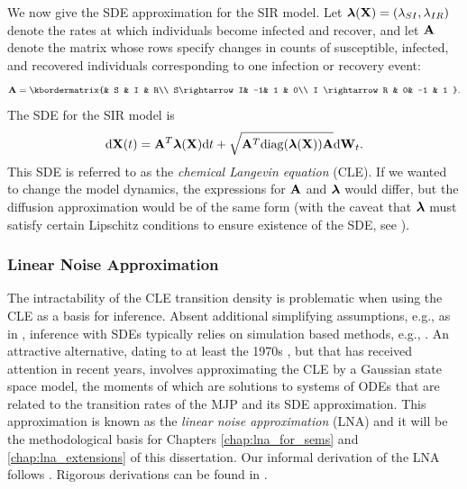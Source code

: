 We now give the SDE approximation for the SIR model. Let $ \boldsymbol{\lambda}(\mathbf{X}) = (\lambda_{SI}, \lambda_{IR}) $ denote the rates at which individuals become infected and recover, and let $ \mathbf{A} $ denote the matrix whose rows specify changes in counts of susceptible, infected, and recovered individuals corresponding to one infection or recovery event:
\begin{equation*}
\bA = \kbordermatrix{& S & I &  R\\
	S\rightarrow I& -1& 1 & 0\\
	I \rightarrow R & 0& -1 & 1
}.
\end{equation*}
The SDE for the SIR model is 
\begin{equation}
\label{eqn:sir_sde}
\mathrm{d}\mathbf{X}(t) = \mathbf{A}^T\boldsymbol{\lambda}(\mathbf{X})\mathrm{d} t + \sqrt{\mathbf{A}^T\mathrm{diag}(\boldsymbol{\lambda}(\mathbf{X}))\mathbf{A}}\mathrm{d}\mathbf{W}_t.
\end{equation}
This SDE is referred to as the \textit{chemical Langevin equation} (CLE). If we wanted to change the model dynamics, the expressions for $ \mathbf{A} $ and $ \boldsymbol{\lambda} $ would differ, but the diffusion approximation would be of the same form (with the caveat that $ \boldsymbol{\lambda} $ must satisfy certain Lipschitz conditions to ensure existence of the SDE, see \cite{fuchs2013inference,oksendal2003stochastic}). 

\subsubsection{Linear Noise Approximation}
\label{subsubsec:lna_background}

The intractability of the CLE transition density is problematic when using the CLE as a basis for inference. Absent additional simplifying assumptions, e.g., as in \cite{cauchemez2008}, inference with SDEs typically relies on simulation based methods, e.g., \cite{dukic2012,golightly2013simulation,golightly2018efficient}. An attractive alternative, dating to at least the 1970s \cite{kurtz1970solutions,kurtz1971limit}, but that has received attention in recent years, involves approximating the CLE by a Gaussian state space model, the moments of which are solutions to systems of ODEs that are related to the transition rates of the MJP and its SDE approximation. This approximation is known as the \textit{linear noise approximation} (LNA) and it will be the methodological basis for Chapters \ref{chap:lna_for_sems} and \ref{chap:lna_extensions} of this dissertation. Our informal derivation of the LNA follows \cite{golightly2013simulation,wilkinson2011stochastic}. Rigorous derivations can be found in \cite{elf2003fast,kurtz1981approximation,vankampen2007stochastic,wallace2012linear}. 

